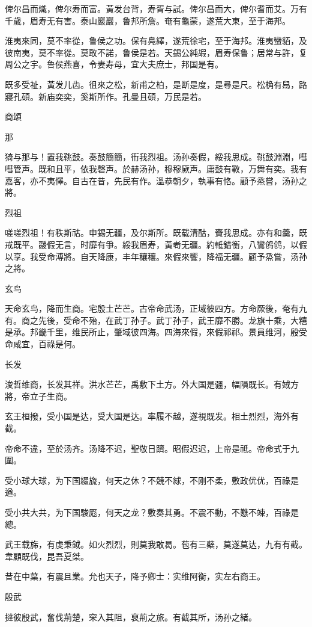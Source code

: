 俾尔昌而熾，俾尔寿而富。黃发台背，寿胥与試。俾尔昌而大，俾尔耆而艾。万有千歲，眉寿无有害。泰山巖巖，鲁邦所詹。奄有龜蒙，遂荒大東，至于海邦。

淮夷來同，莫不率從，鲁侯之功。保有鳧繹，遂荒徐宅，至于海邦。淮夷蠻貊，及彼南夷，莫不率從。莫敢不諾，鲁侯是若。天錫公純嘏，眉寿保鲁；居常与許，复周公之宇。鲁侯燕喜，令妻寿母，宜大夫庶士，邦国是有。

既多受祉，黃发儿齿。徂來之松，新甫之柏，是断是度，是尋是尺。松桷有舄，路寢孔碩。新庙奕奕，奚斯所作。孔曼且碩，万民是若。




商頌


那

猗与那与！置我鞉鼓。奏鼓簡簡，衎我烈祖。汤孙奏假，綏我思成。鞉鼓淵淵，嘒嘒管声。既和且平，依我磬声。於赫汤孙，穆穆厥声。庸鼓有斁，万舞有奕。我有嘉客，亦不夷懌。自古在昔，先民有作。溫恭朝夕，執事有恪。顧予烝嘗，汤孙之將。

烈祖

嗟嗟烈祖！有秩斯祜。申錫无疆，及尔斯所。既载清酤，賚我思成。亦有和羹，既戒既平。鬷假无言，时靡有爭。綏我眉寿，黃耇无疆。約軧錯衡，八鸞鸧鸧，以假以享。我受命溥將。自天降康，丰年穰穰。來假來饗，降福无疆。顧予烝嘗，汤孙之將。

玄鸟

天命玄鸟，降而生商。宅殷土芒芒。古帝命武汤，正域彼四方。方命厥後，奄有九有。商之先後，受命不殆，在武丁孙子。武丁孙子，武王靡不勝。龙旗十乘，大糦是承。邦畿千里，维民所止，肇域彼四海。四海來假，來假祁祁。景員维河，殷受命咸宜，百祿是何。

长发

浚哲维商，长发其祥。洪水芒芒，禹敷下土方。外大国是疆，幅隕既长。有娀方將，帝立子生商。

玄王桓撥，受小国是达，受大国是达。率履不越，遂視既发。相土烈烈，海外有截。

帝命不違，至於汤齐。汤降不迟，聖敬日躋。昭假迟迟，上帝是祗。帝命式于九圍。

受小球大球，为下国綴旒，何天之休？不競不絿，不刚不柔，敷政优优，百祿是遒。

受小共大共，为下国駿厖，何天之龙？敷奏其勇。不震不動，不戁不竦，百祿是總。

武王载旆，有虔秉鉞。如火烈烈，則莫我敢曷。苞有三蘗，莫遂莫达，九有有截。韋顧既伐，昆吾夏桀。

昔在中葉，有震且業。允也天子，降予卿士：实维阿衡，实左右商王。

殷武

撻彼殷武，奮伐荊楚，穼入其阻，裒荊之旅。有截其所，汤孙之緒。

